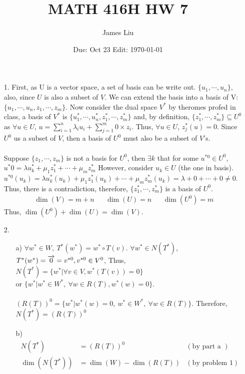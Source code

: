 \documentclass{article}
\date{Due: Oct 23 Edit: \today}
\title{MATH 416H HW 7}
\author{James Liu}
\begin{document}
\maketitle
\begin{itemize}
    \item [1.] First, as U is a vector space, a set of basis can be write out. \(\{u_1,\cdots,u_n\}\), 
    also, since \(U\) is also a subset of \(V\). We can extend the basis into a basis of V: 
    \(\{u_1,\cdots,u_n,z_1,\cdots,z_m\}\). Now consider the dual space \(V^*\) by theromes profed in class, 
    a basis of \(V^*\) is \(\{u_1^*,\cdots,u_n^*,z_1^*,\cdots,z_m^*\}\) and, 
    by definition, \(\{z_1^*,\cdots,z_m^*\}\subseteq U^0\) as \(\forall u \in U\), \(u=\sum_{i=1}^n\lambda_iu_i+\sum_{j=1}^{m}0\times z_i\). 
    Thus, \(\forall u\in U\), \(z_j^*(u)=0\). Since \(U^0\) us a subset of \(V\), then a basis of \(U^0\) must also be a subset of \(V\)'s.
    \\
    \\
    Suppose \(\{z_1,\cdots,z_m\}\) is not a basis for \(U^0\), then \(\exists k\) that for some \(u^{*0}\in U^0\), \(u^*0=\lambda u_k^*+\mu_1z_1^*+\cdots+\mu_mz_m^*\) However, consider \(u_k\in U\) (the one in basis). 
    \(u^{*0}(u_k)=\lambda u_k^*(u_k)+\mu_1z_1^*(u_k)+\cdots+\mu_mz_m^*(u_k)=\lambda +0+\cdots+0\neq 0\). Thus, there is a contradiction, therefore, \(\{z_1^*,\cdots ,z_m^*\}\) is a basis of \(U^0\).
    \begin{align*}
        \dim(V)=m+n&&\dim(U)=n&&\dim(U^0)=m
    \end{align*}
    Thus, \(\dim(U^0)+\dim(U)=\dim(V)\).
    \item [2.]
    \begin{itemize}
        \item [a)]\(\forall w^*\in W,\ T^*(w^*) = w^*\circ T(v)\). \(\forall w^*\in N(T^*)\), \(T^*(w^*)=\overrightarrow{0}=v^{*0},\\ v^{*0}\in V^0\), Thus, \(N(T^*)=\{w^*|\forall v\in V, w^*(T(v))=0\}\)
        \\ or \(\{w^*|w^*\in W^*,\ \forall w \in R(T), w^*(w)=0\}\).\\ \\ 
        \((R(T))^0=\{w^*|w^*(w)=0,\ w^*\in W^*, \ \forall w\in R(T)\}\). Therefore, \(N(T^*)=(R(T))^0\)
        \item [b)]
        \begin{align*}
            N(T^*)&=(R(T))^0&(\text{by part a })\\
            \dim(N(T^*))&=\dim(W)-\dim(R(T))&(\text{by problem 1})\\

\end{align*}
\end{itemize}
\end{itemize}
\end{document}
